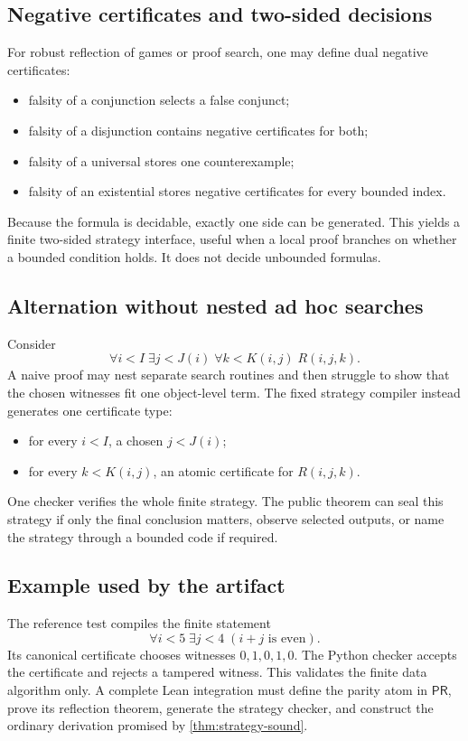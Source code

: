 \subsection{Negative certificates and two-sided decisions}

For robust reflection of games or proof search, one may define dual negative
certificates:
\begin{itemize}
  \item falsity of a conjunction selects a false conjunct;
  \item falsity of a disjunction contains negative certificates for both;
  \item falsity of a universal stores one counterexample;
  \item falsity of an existential stores negative certificates for every
        bounded index.
\end{itemize}
Because the formula is decidable, exactly one side can be generated.  This
yields a finite two-sided strategy interface, useful when a local proof
branches on whether a bounded condition holds.  It does not decide unbounded
formulas.

\subsection{Alternation without nested ad hoc searches}

Consider
\[
  \forall i<I\;\exists j<J(i)\;\forall k<K(i,j)\;R(i,j,k).
\]
A naive proof may nest separate search routines and then struggle to show that
the chosen witnesses fit one object-level term.  The fixed strategy compiler
instead generates one certificate type:
\begin{itemize}
  \item for every \(i<I\), a chosen \(j<J(i)\);
  \item for every \(k<K(i,j)\), an atomic certificate for \(R(i,j,k)\).
\end{itemize}
One checker verifies the whole finite strategy.  The public theorem can seal
this strategy if only the final conclusion matters, observe selected outputs,
or name the strategy through a bounded code if required.

\subsection{Example used by the artifact}

The reference test compiles the finite statement
\[
  \forall i<5\;\exists j<4\; (i+j\text{ is even}).
\]
Its canonical certificate chooses witnesses \(0,1,0,1,0\).  The Python
checker accepts the certificate and rejects a tampered witness.  This validates
the finite data algorithm only.  A complete Lean integration must define the
parity atom in \(\mathsf{PR}\), prove its reflection theorem, generate the
strategy checker, and construct the ordinary derivation promised by
\cref{thm:strategy-sound}.
